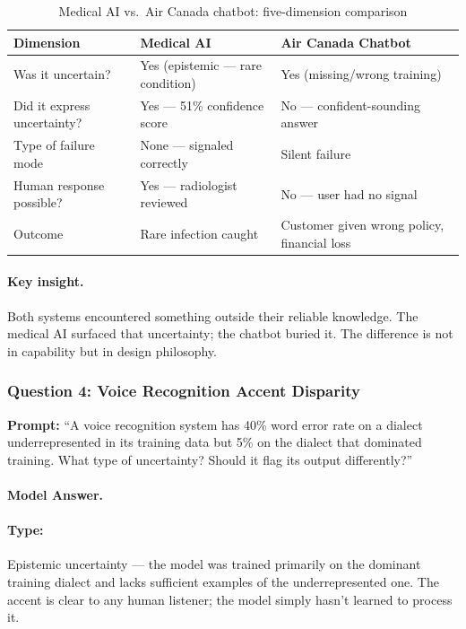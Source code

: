 \begin{table}[htbp]
\caption{Medical AI vs.\ Air Canada chatbot: five-dimension comparison}
\label{tab:medical-aircanada}
\centering
\begin{tabular}{@{}p{3.5cm}p{4.5cm}p{4.5cm}@{}}
\toprule
\textbf{Dimension} & \textbf{Medical AI} & \textbf{Air Canada Chatbot} \\
\midrule
Was it uncertain? & Yes (epistemic --- rare condition) & Yes (missing/wrong training) \\
Did it express uncertainty? & Yes --- 51\% confidence score & No --- confident-sounding answer \\
Type of failure mode & None --- signaled correctly & Silent failure \\
Human response possible? & Yes --- radiologist reviewed & No --- user had no signal \\
Outcome & Rare infection caught & Customer given wrong policy, financial loss \\
\bottomrule
\end{tabular}
\end{table}

\paragraph{Key insight.} Both systems encountered something outside their reliable knowledge. The medical AI surfaced that uncertainty; the chatbot buried it. The difference is not in capability but in design philosophy.

\subsubsection{Question 4: Voice Recognition Accent Disparity}

\textbf{Prompt:} ``A voice recognition system has 40\% word error rate on a dialect underrepresented in its training data but 5\% on the dialect that dominated training. What type of uncertainty? Should it flag its output differently?''

\paragraph{Model Answer.}

\paragraph{Type:} Epistemic uncertainty --- the model was trained primarily on the dominant training dialect and lacks sufficient examples of the underrepresented one. The accent is clear to any human listener; the model simply hasn't learned to process it.

